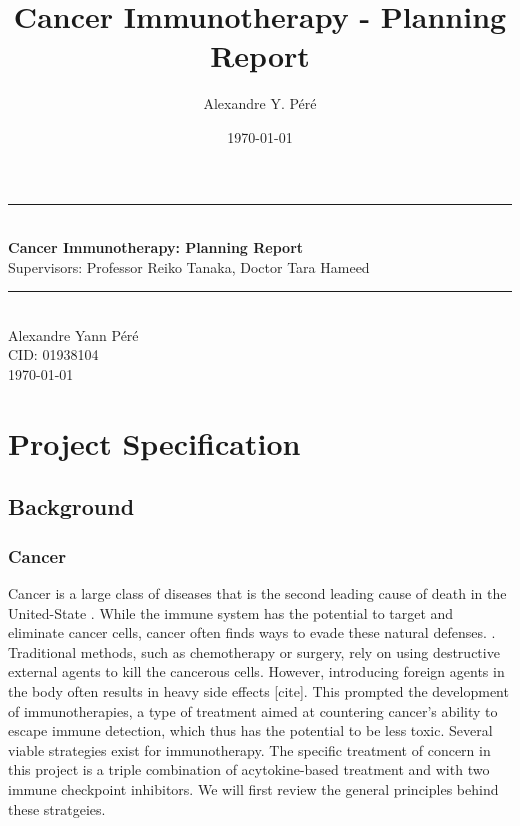 \documentclass[11pt]{article}
\title{Cancer Immunotherapy - Planning Report}
\author{Alexandre Y. Péré }
\date{\today}
\begin{document}
\begin{titlepage}
    \newcommand{\HRule}{\rule{\linewidth}{0.5mm}}
    \begin{center}
        \HRule \\[0.4cm]
    { \huge \bfseries Cancer Immunotherapy: Planning Report \\[0.15cm] }
    Supervisors: Professor Reiko Tanaka, Doctor Tara Hameed 
    \\[0.4cm]
    \HRule \\[0.5cm]
    Alexandre Yann Péré \\[0.1cm]
    CID: 01938104  \\[0.1cm]
    \today \\ [0.1cm]
    \end{center}
\end{titlepage}

\tableofcontents


%

\pagebreak 
\section{Project Specification}\label{sec:specs}

\subsection{Background}
\subsubsection{Cancer}
Cancer is a large class of diseases that is the second leading cause of death in the United-State \cite{nchs}. While the immune system has the potential to target and eliminate cancer cells, cancer often finds ways to evade these natural defenses. \cite{EvasionMech}. Traditional methods, such as chemotherapy or surgery, rely on using destructive external agents to kill the cancerous cells. However, introducing foreign agents in the body often results in heavy side effects [cite]. This prompted the development of immunotherapies, a type of treatment aimed at countering cancer's ability to escape immune detection, which thus has the potential to be less toxic. Several viable strategies exist for immunotherapy. The specific treatment of concern in this project is a triple combination of  acytokine-based treatment and with two immune checkpoint inhibitors. We will first review the general principles behind these stratgeies.
\end{document}
